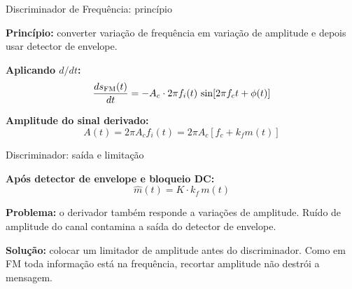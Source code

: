\begin{frame}{Discriminador de Frequência: princípio}

\textbf{Princípio:} converter variação de frequência em variação de amplitude e depois usar detector de envelope.

\begin{center}
\end{center}

\pause
\textbf{Aplicando $d/dt$:}
\[
\frac{ds_{\text{FM}}(t)}{dt} = -A_c \cdot 2\pi f_i(t)\,\sin[2\pi f_c t + \phi(t)]
\]

\pause
\textbf{Amplitude do sinal derivado:}
\[
A(t) = 2\pi A_c f_i(t) = 2\pi A_c [f_c + k_f m(t)]
\]

\end{frame}


\begin{frame}{Discriminador: saída e limitação}

\textbf{Após detector de envelope e bloqueio DC:}
\[
\hat{m}(t) = K\cdot k_f\, m(t)
\]

\vspace{0.3cm}
\pause
\textbf{Problema:} o derivador também responde a variações de amplitude. Ruído de amplitude do canal contamina a saída do detector de envelope.

\vspace{0.3cm}
\pause
\textbf{Solução:} colocar um limitador de amplitude antes do discriminador. Como em FM toda informação está na frequência, recortar amplitude não destrói a mensagem.

\end{frame}


